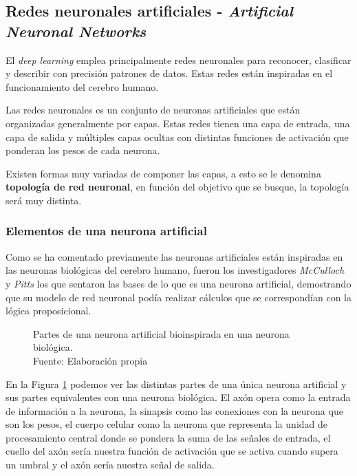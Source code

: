 \subsection{Redes neuronales artificiales - \textit{Artificial Neuronal Networks}}
El \textit{deep learning} emplea principalmente redes neuronales para reconocer, clasificar y describir con precisión patrones de datos. Estas redes están inspiradas en el funcionamiento del cerebro humano.  \cite{ibm-deep-learning}

Las redes neuronales es un conjunto de neuronas artificiales que están organizadas generalmente por capas. Estas redes tienen una capa de entrada, una capa de salida y múltiples capas ocultas con distintas funciones de activación que ponderan los pesos de cada neurona.

Existen formas muy variadas de componer las capas, a esto se le denomina \textbf{topología de red neuronal}, en función del objetivo que se busque, la topología será muy distinta.

\subsubsection{Elementos de una neurona artificial}

Como se ha comentado previamente las neuronas artificiales están inspiradas en las neuronas biológicas del cerebro humano, fueron los investigadores \textit{McCulloch} y \textit{Pitts} \cite{mcculloch1943logical} los que sentaron las bases de lo que es una neurona artificial, demostrando que su modelo de red neuronal podía realizar cálculos que se correspondían con la lógica proposicional.


\begin{figure}[H]
    \centering
    \centerline{}
    \caption{Partes de una neurona artificial bioinspirada en una neurona biológica.\\Fuente: Elaboración propia}
    \label{fig:artificial-neuron}
\end{figure}

En la Figura \ref{fig:artificial-neuron} podemos ver las distintas partes de una única neurona artificial y sus partes equivalentes con una neurona biológica. El axón opera como la entrada de información a la neurona, la sinapsis como las conexiones con la neurona que son los pesos, el cuerpo celular como la neurona que representa la unidad de procesamiento central donde se pondera la suma de las señales de entrada, el cuello del axón sería nuestra función de activación que se activa cuando supera un umbral y el axón sería nuestra señal de salida.



